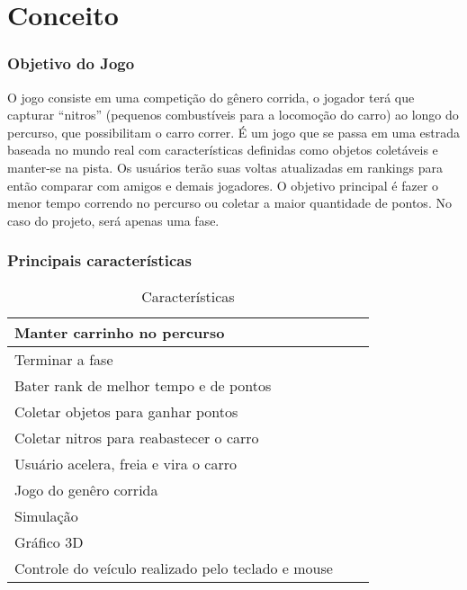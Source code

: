 \part{Conceito}
\section{Objetivo do Jogo}

O jogo consiste em uma competição do gênero corrida, o jogador terá que capturar “nitros” (pequenos combustíveis para a locomoção do carro) ao longo do percurso, que possibilitam o carro correr. É um jogo que se passa em uma estrada baseada no mundo real com características definidas como objetos coletáveis e manter-se na pista. Os usuários terão suas voltas atualizadas em rankings para então comparar com amigos e demais jogadores. O objetivo principal é fazer o menor tempo correndo no percurso ou coletar a maior quantidade de pontos. No caso do projeto, será apenas uma fase.


\section{Principais características}

\begin{table}[h]
		\caption{Características}
	\begin{center}
	\begin{tabular}{|l|ll|}
		\hline Manter carrinho no percurso \\
		\hline Terminar a fase \\
		\hline Bater rank de melhor tempo e de pontos \\
		\hline Coletar objetos para ganhar pontos \\
		\hline Coletar nitros para reabastecer o carro \\
		\hline Usuário acelera, freia e vira o carro \\
		\hline Jogo do genêro corrida\\
		\hline Simulação \\
		\hline Gráfico 3D \\
		\hline Controle do veículo realizado pelo teclado e mouse \\
		\hline
	\end{tabular}
	\end{center}
\end{table}